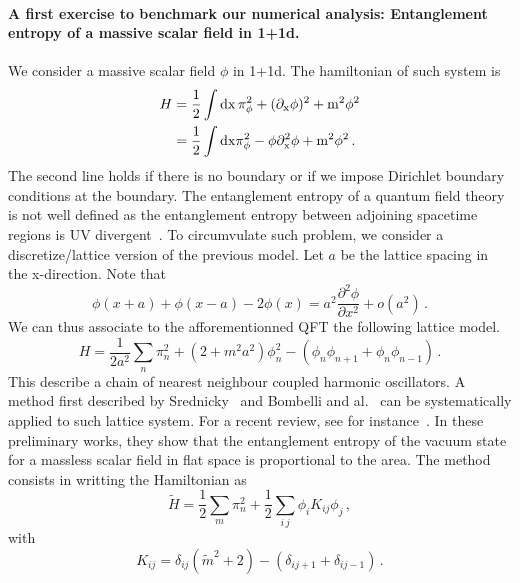 \documentclass[a4paper]{article}
\begin{document}
\paragraph{A first exercise to benchmark our numerical analysis: Entanglement entropy of a massive scalar field in 1+1d.}
We consider a massive scalar field $\phi$ in 1+1d. The hamiltonian of such system is
\begin{equation}
\begin{aligned}
     H &= \frac{1}{2}\int \rm{d}x \,\pi_\phi^2 + (\partial_x \phi)^2 + m^2 \phi^2 \\
       &= \frac{1}{2}\int \rm{d}x \pi_\phi^2 - \phi \partial^2_x \phi + m^2 \phi^2\,.
\end{aligned}
\end{equation}
The second line holds if there is no boundary or if we impose Dirichlet boundary conditions at the boundary. The entanglement entropy of a quantum field theory is not well defined as the entanglement entropy between adjoining spacetime regions is UV divergent~\cite{Witten_2018}. To circumvulate such problem, we consider a discretize/lattice version of the previous model. Let $a$ be the lattice spacing in the x-direction. Note that
\begin{equation}
  \phi(x+a)+\phi(x-a)-2\phi(x) = a^2 \frac{\partial^2 \phi}{\partial x^2}+o(a^2)\,.
\end{equation}
We can thus associate to the afforementionned QFT the following lattice model.
\begin{equation}
  H = \frac{1}{2a^2}\sum_n \pi_n^2 + (2+m^2 a^2)\phi_n^2 -(\phi_n\phi_{n+1}+\phi_n \phi_{n-1})\,.
\end{equation}
This describe a chain of nearest neighbour coupled harmonic oscillators. A method first described by Srednicky~\cite{Srednicki_1993} and Bombelli and al.~\cite{Bombelli:1986rw} can be systematically applied to such lattice system. For a recent review, see for instance~\cite{Casini_2009}\cite{bellucci2026entanglemententropymassivescalar}\cite{Boutivas_2023}\cite{Boutivas_2024}. In these preliminary works, they show that the entanglement entropy of the vacuum state for a massless scalar field in flat space is proportional to the area. The method consists in writting the Hamiltonian as
\begin{equation}
  \tilde{H} = \frac{1}{2}\sum_m \pi_n^2 + \frac{1}{2}\sum_{i\,j}\phi_i K_{ij}\phi_j\,,
\end{equation}
with
\begin{equation}
  K_{ij}= \delta_{ij}\left(\tilde{m}^2 + 2\right)-\left(\delta_{i j+1}+ \delta_{i j-1}\right)\,.
\end{equation}
\end{document}
